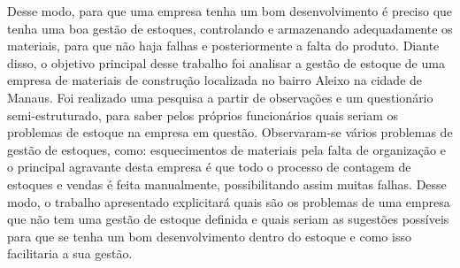 Desse modo, para que uma empresa tenha um bom desenvolvimento é preciso que tenha uma boa gestão de estoques, controlando e armazenando adequadamente os materiais, para que não haja falhas e posteriormente a falta do produto. Diante disso, o objetivo principal desse trabalho foi analisar a gestão de estoque de uma empresa de materiais de construção localizada no bairro Aleixo na cidade de Manaus. Foi realizado uma pesquisa a partir de observações e um questionário semi-estruturado, para saber pelos próprios funcionários quais seriam os problemas de estoque na empresa em questão. Observaram-se vários problemas de gestão de estoques, como: esquecimentos de materiais pela falta de organização e o principal agravante desta empresa é que todo o processo de contagem de estoques e vendas é feita manualmente, possibilitando assim muitas falhas. 
Desse modo, o trabalho apresentado explicitará quais são os problemas de uma empresa que não tem uma gestão de estoque definida e quais seriam as sugestões possíveis para que se tenha um bom desenvolvimento dentro do estoque e como isso facilitaria a sua gestão.
